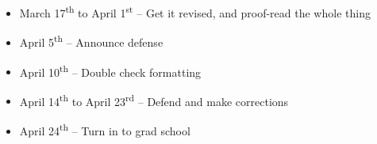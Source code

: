 \begin{itemize}
\item March 17\textsuperscript{th} to April 1\textsuperscript{st} -- Get it revised, and proof-read the whole thing

\item April 5\textsuperscript{th} -- Announce defense

\item April 10\textsuperscript{th} -- Double check formatting

\item April 14\textsuperscript{th} to April 23\textsuperscript{rd} -- Defend and make corrections

\item April 24\textsuperscript{th} -- Turn in to grad school
\end{itemize}